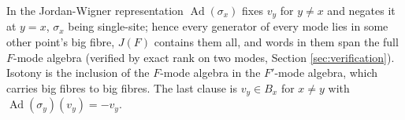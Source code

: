 In the Jordan-Wigner representation $\operatorname{Ad}(\sigma_x)$ fixes $v_y$ for $y \neq x$ and negates it at $y = x$, $\sigma_x$ being single-site; hence every generator of every mode lies in some other point's big fibre, $J(F)$ contains them all, and words in them span the full $F$-mode algebra (verified by exact rank on two modes, Section \ref{sec:verification}). Isotony is the inclusion of the $F$-mode algebra in the $F'$-mode algebra, which carries big fibres to big fibres. The last clause is $v_y \in B_x$ for $x \neq y$ with $\operatorname{Ad}(\sigma_y)(v_y) = -v_y$.

